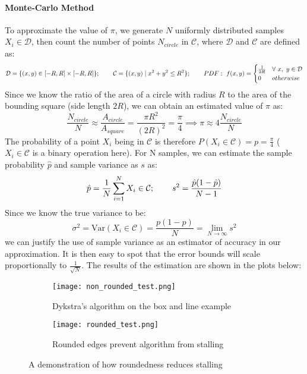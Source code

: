 \documentclass[hidelinks]{article}
\begin{document}
\paragraph{Monte-Carlo Method}
To approximate the value of $\pi$, we generate $N$ uniformly distributed samples $X_{i} \in \mathcal{D}$, then count the number of points $N_{circle}$ in $\mathcal{C}$, where $\mathcal{D}$ and $\mathcal{C}$ are defined as:
\[
\mathcal{D} = \{ (x, y) \in [-R, R] \times [-R, R] \}; \hspace{0.75cm} \mathcal{C} = \{(x, y) \mid x^2 + y^2 \leq R^2\}; \hspace{0.75cm} PDF:~f(x, y) = 
\begin{cases} 
\frac{1}{2R} & \forall~x,~y \in \mathcal{D}\\
0  & otherwise \\
\end{cases}
\]
Since we know the ratio of the area of a circle with radius $R$ to the area of the bounding square (side length $2R$), we can obtain an estimated value of $\pi$ as:
\[
\frac{N_{circle}}{N} \approx \frac{A_{circle}}{A_{square}} = \frac{\pi R^2}{(2R)^2} = \frac{\pi}{4} \implies \pi \approx 4 \frac{N_{circle}}{N}
\]
The probability of a point $X_i$ being in $\mathcal{C}$ is therefore $P(X_i \in \mathcal{C}) = p = \frac{\pi}{4}$ ($X_i \in \mathcal{C}$ is a binary operation here). For N samples, we can estimate the sample probability $\hat{p}$ and sample variance as $s$ as:
\[
\hat{p} = \frac{1}{N}\sum_{i=1}^{N} X_i \in \mathcal{C}; \hspace{0.75cm} s^2 = \frac{\hat{p}(1 - \hat{p})}{N - 1}
\]
Since we know the true variance to be:
\[
\sigma^2 = \mathrm{Var}(X_i \in \mathcal{C}) = \frac{p(1 - p)}{N} = \lim_{N \to \infty} s^2
\]
we can justify the use of sample variance as an estimator of accuracy in our approximation. It is then easy to spot that the error bounds will scale proportionally to $\frac{1}{\sqrt{N}}$. The results of the estimation are shown in the plots below:
%
\begin{figure}[h!]
    \centering
    
    \begin{subfigure}[t]{0.49\textwidth}
        \centering
        \texttt{[image: non\_rounded\_test.png]}
        \caption{Dykstra's algorithm on the box and line example}
        \label{fig:nonRounded}
    \end{subfigure}
    \hfill
    \begin{subfigure}[t]{0.49\textwidth}
        \centering
        \texttt{[image: rounded\_test.png]}
        \caption{Rounded edges prevent algorithm from stalling}
        \label{fig:Rounded}
    \end{subfigure}
    \caption{A demonstration of how roundedness reduces stalling}
    \label{fig:stall}
\end{figure}
$$
\end{document}

